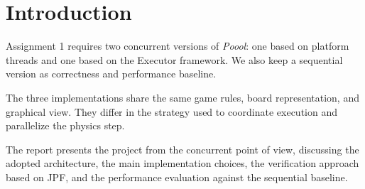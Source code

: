 \section{Introduction}

Assignment 1 requires two concurrent versions of \emph{Poool}: one based on
platform threads and one based on the Executor framework. We also keep a
sequential version as correctness and performance baseline.

The three implementations share the same game rules, board representation, and
graphical view. They differ in the strategy used to coordinate execution and
parallelize the physics step.

The report presents the project from the concurrent point of view, discussing
the adopted architecture, the main implementation choices, the verification
approach based on JPF, and the performance evaluation against the sequential
baseline.
